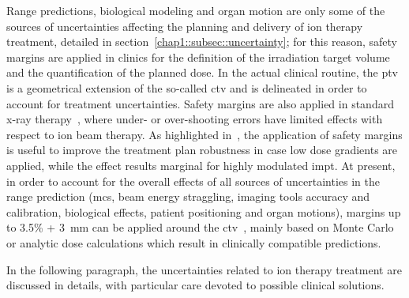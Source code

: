 Range predictions, biological modeling and organ motion are only some of the sources of uncertainties affecting the planning and delivery of ion therapy treatment, detailed in section~\ref{chap1::subsec::uncertainty}; for this reason, safety margins  are applied in clinics for the definition of the irradiation target volume and the quantification of the planned dose. In the actual clinical routine, the \gls{ptv} is a geometrical extension of the so-called \gls{ctv} and is delineated in order to account for treatment uncertainties. Safety margins are also applied in standard x-ray therapy~\parencite{McKenzie2000}, where under- or over-shooting errors have limited effects with respect to ion beam therapy. As highlighted in~\cite{Albertini2011}, the application of safety margins is useful to improve the treatment plan robustness in case low dose gradients are applied, while the effect results marginal for highly modulated \gls{impt}. At present, in order to account for the overall effects of all sources of uncertainties in the range prediction (\gls{mcs}, beam energy straggling, imaging tools accuracy and calibration, biological effects, patient positioning and organ motions), margins up to 3.5\% + 3~mm can be applied around the \gls{ctv}~\parencite{Paganetti2012}, mainly based on Monte Carlo or analytic dose calculations which result in clinically compatible predictions. 

In the following paragraph, the uncertainties related to ion therapy treatment are discussed in details, with particular care devoted to possible clinical solutions.

